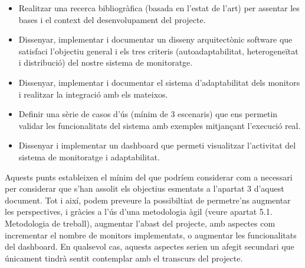 \begin{itemize}
\item Realitzar una recerca bibliogràfica (basada en l’estat de l’art) per assentar les bases i el context del desenvolupament del projecte.
\item Dissenyar, implementar i documentar un disseny arquitectònic software que satisfaci l’objectiu general i els tres criteris (autoadaptabilitat, heterogeneïtat i distribució) del nostre sistema de monitoratge.
\item Dissenyar, implementar i documentar el sistema d'adaptabilitat dels monitors i realitzar la integració amb els mateixos.
\item Definir una sèrie de casos d'ús (mínim de 3 escenaris) que ens permetin validar les funcionalitats del sistema amb exemples mitjançant l'execució real.
\item Dissenyar i implementar un dashboard que permeti visualitzar l'activitat del sistema de monitoratge i adaptabilitat.
\end{itemize}

Aquests punts estableixen el mínim del que podríem considerar com a necessari per considerar que s’han assolit els objectius esmentats a l’apartat 3 d’aquest document. Tot i així, podem preveure la possibiltiat de permetre’ns augmentar les perspectives, i gràcies a l’ús d’una metodologia àgil (veure apartat 5.1. Metodologia de treball), augmentar l’abast del projecte, amb aspectes com incrementar el nombre de monitors implementats, o augmentar les funcionalitats del dashboard. En qualsevol cas, aquests aspectes serien un afegit secundari que únicament tindrà sentit contemplar amb el transcurs del projecte.